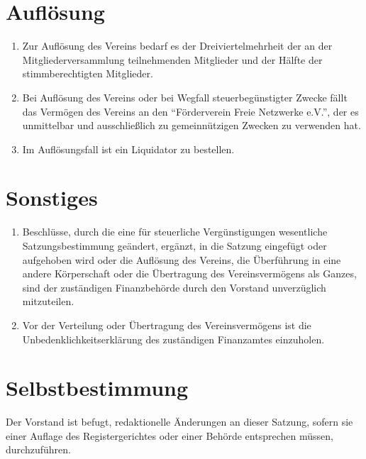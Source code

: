 \documentclass[ngerman]{article}
\begin{document}
\section{Auflösung}
\begin{enumerate}
  \item Zur Auflösung des Vereins bedarf es der Dreiviertelmehrheit der an der Mitgliederversammlung teilnehmenden Mitglieder und der Hälfte der stimmberechtigten Mitglieder.
  \item Bei Auflösung des Vereins oder bei Wegfall steuerbegünstigter Zwecke fällt das Vermögen des Vereins an den "`Förderverein Freie Netzwerke e.V."', der es unmittelbar und ausschließlich zu gemeinnützigen Zwecken zu verwenden hat.
  \item Im Auflösungsfall ist ein Liquidator zu bestellen.
\end{enumerate}


\section{Sonstiges}
\begin{enumerate}
  \item Beschlüsse, durch die eine für steuerliche Vergünstigungen wesentliche Satzungsbestimmung geändert, ergänzt, in die Satzung eingefügt oder aufgehoben wird oder die Auflösung des Vereins, die Überführung in eine andere Körperschaft oder die Übertragung des Vereinsvermögens als Ganzes, sind der zuständigen Finanzbehörde durch den Vorstand unverzüglich mitzuteilen.
  \item Vor der Verteilung oder Übertragung des Vereinsvermögens ist die Unbedenklichkeitserklärung des zuständigen Finanzamtes einzuholen.
\end{enumerate}


\section{Selbstbestimmung}
Der Vorstand ist befugt, redaktionelle Änderungen an dieser Satzung, sofern sie einer Auflage des Registergerichtes oder einer Behörde entsprechen müssen, durchzuführen.
\end{document}
